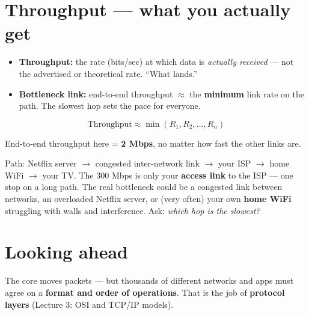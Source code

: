 \section{Throughput --- what you actually get}
\begin{itemize}
  \item \textbf{Throughput:} the rate (bits/sec) at which data is \emph{actually received} --- not the advertised or theoretical rate. ``What lands.''
  \item \textbf{Bottleneck link:} end-to-end throughput $\approx$ the \textbf{minimum} link rate on the path. The slowest hop sets the pace for everyone.
\end{itemize}
\[ \text{Throughput} \approx \min(R_1, R_2, \ldots, R_n) \]

\begin{center}
\end{center}
End-to-end throughput here = \textbf{2 Mbps}, no matter how fast the other links are.

\begin{workedex}
Path: Netflix server $\to$ congested inter-network link $\to$ your ISP $\to$ home WiFi $\to$ your TV.
The 300 Mbps is only your \textbf{access link} to the ISP --- one stop on a long path. The real bottleneck could be a congested link between networks, an overloaded Netflix server, or (very often) your own \textbf{home WiFi} struggling with walls and interference. Ask: \emph{which hop is the slowest?}
\end{workedex}

\section{Looking ahead}
The core moves packets --- but thousands of different networks and apps must agree on a \textbf{format and order of operations}. That is the job of \textbf{protocol layers} (Lecture 3: OSI and TCP/IP models).

